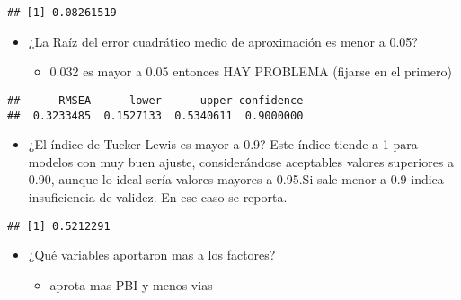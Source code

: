 \documentclass[
]{article}
\newenvironment{Shaded}{\begin{snugshade}}{\end{snugshade}}
\newcommand{\NormalTok}[1]{#1}
\newcommand{\OperatorTok}[1]{\textcolor[rgb]{0.81,0.36,0.00}{\textbf{#1}}}
\providecommand{\tightlist}{%
  \setlength{\itemsep}{0pt}\setlength{\parskip}{0pt}}
\begin{document}
\begin{verbatim}
## [1] 0.08261519
\end{verbatim}

\begin{itemize}
\tightlist
\item
  ¿La Raíz del error cuadrático medio de aproximación es menor a 0.05?

  \begin{itemize}
  \tightlist
  \item
    0.032 es mayor a 0.05 entonces HAY PROBLEMA (fijarse en el primero)
  \end{itemize}
\end{itemize}

\begin{Shaded}
\end{Shaded}

\begin{verbatim}
##      RMSEA      lower      upper confidence 
##  0.3233485  0.1527133  0.5340611  0.9000000
\end{verbatim}

\begin{itemize}
\tightlist
\item
  ¿El índice de Tucker-Lewis es mayor a 0.9? Este índice tiende a 1 para
  modelos con muy buen ajuste, considerándose aceptables valores
  superiores a 0.90, aunque lo ideal sería valores mayores a 0.95.Si
  sale menor a 0.9 indica insuficiencia de validez. En ese caso se
  reporta.
\end{itemize}

\begin{Shaded}
\end{Shaded}

\begin{verbatim}
## [1] 0.5212291
\end{verbatim}

\begin{itemize}
\tightlist
\item
  ¿Qué variables aportaron mas a los factores?

  \begin{itemize}
  \tightlist
  \item
    aprota mas PBI y menos vias
  \end{itemize}
\end{itemize}
\end{document}
